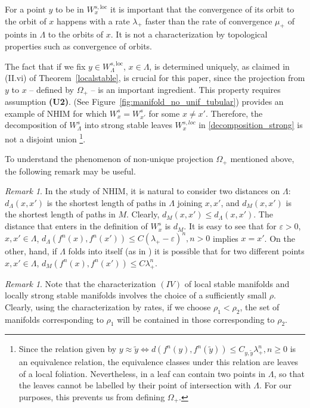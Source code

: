 \documentclass[11pt]{amsart}
\theoremstyle{definition}
\theoremstyle{remark}
\newtheorem{rem}[thm]{Remark}
\numberwithin{equation}{section}
\newcommand{\eps}{\varepsilon}
\begin{document}
For a point $y$ to be in $W^{s,\textrm{loc}}_x$ it is important
that the convergence of its orbit to the orbit of $x$
happens with a rate $\lambda_+$ faster  than the rate of convergence
$\mu_+$ of points in $\Lambda$ to the orbits of $x$.
It is not a characterization by topological properties
such as convergence of orbits.



The fact that if we fix $y \in W^{s,\textrm{loc}}_\Lambda$, $x \in \Lambda$, is
determined uniquely, as claimed in (II.vi) of
Theorem~\ref{localstable}, is crucial for this paper, since
the projection from $y$ to $x$ -- defined by $\Omega_+$ --
is an important ingredient.
This property requires assumption {\bf (U2)}.
\cite[Example 2.9]{Eldering12}
(See Figure~\ref{fig:manifold_no_unif_tubular})
provides an example of
NHIM for which  $W^s_{x} =  W^s_{x'}$ for
some $x\ne x'$.  Therefore,  the decomposition of $W^s_\Lambda$
into strong stable leaves $W^{s,loc}_x$  in \eqref{decomposition_strong}
is not a disjoint union  \footnote{Since the relation given by
$y \approx  \tilde y \iff d(f^n(y), f^n(\tilde y))
\le C_{y,\tilde y}\lambda_+^n, n \ge 0$ is an equivalence relation, the equivalence classes under
this relation
are leaves of a local foliation. Nevertheless, in  \cite[Example 2.9]{Eldering12}
a leaf can contain two
points in $\Lambda$, so that the leaves cannot
be labelled by their point of intersection
with $\Lambda$. For our purposes, this prevents us from
defining   $\Omega_+$. }.


To understand the phenomenon of non-unique projection $\Omega_+$
mentioned above, the following remark may be useful.

\begin{rem}
In the study of NHIM, it is natural to consider two distances on $\Lambda$:
$d_\Lambda(x,x')$ is the shortest length of paths in $\Lambda$ joining $x,x'$,
and $d_M(x,x') $ is the shortest length of paths in $M$.
Clearly, $d_M(x,x') \le d_\Lambda(x,x')$.
The distance that enters in the definition of $W^s_x$ is $d_M$.
It is easy to see that for $\eps > 0 $, $x,x'\in\Lambda$,
$d_\Lambda( f^n(x), f^n(x') ) \le C (\lambda_+ -\eps)^n, n >0$
implies $x = x'$.
On the other, hand, if $\Lambda$ folds into itself (as in \cite[Example 2.9]{Eldering12}) it
is possible that  for two different  points $x,x' \in \Lambda$,
$d_M( f^n(x), f^n(x')) \le C \lambda_+^n $.
\end{rem}


\begin{rem}
Note that the characterization $(IV)$ of local
stable manifolds and locally strong stable manifolds
involves the choice of a sufficiently small $\rho$.
Clearly, using the characterization by rates,
if we choose $\rho_1 < \rho_2$,
the set of manifolds corresponding to $\rho_1$ will
be contained in those corresponding to $\rho_2$.
\end{rem}
\end{document}
